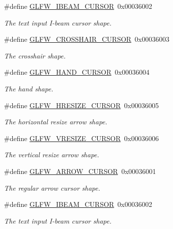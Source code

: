\begin{DoxyCompactItemize}
\#define \hyperlink{group__shapes_ga36185f4375eaada1b04e431244774c86}{G\+L\+F\+W\+\_\+\+I\+B\+E\+A\+M\+\_\+\+C\+U\+R\+S\+OR}~0x00036002
\begin{DoxyCompactList}\small\item\em The text input I-\/beam cursor shape. \end{DoxyCompactList}\item 
\#define \hyperlink{group__shapes_ga8af88c0ea05ab9e8f9ac1530e8873c22}{G\+L\+F\+W\+\_\+\+C\+R\+O\+S\+S\+H\+A\+I\+R\+\_\+\+C\+U\+R\+S\+OR}~0x00036003
\begin{DoxyCompactList}\small\item\em The crosshair shape. \end{DoxyCompactList}\item 
\#define \hyperlink{group__shapes_ga1db35e20849e0837c82e3dc1fd797263}{G\+L\+F\+W\+\_\+\+H\+A\+N\+D\+\_\+\+C\+U\+R\+S\+OR}~0x00036004
\begin{DoxyCompactList}\small\item\em The hand shape. \end{DoxyCompactList}\item 
\#define \hyperlink{group__shapes_gabb3eb0109f11bb808fc34659177ca962}{G\+L\+F\+W\+\_\+\+H\+R\+E\+S\+I\+Z\+E\+\_\+\+C\+U\+R\+S\+OR}~0x00036005
\begin{DoxyCompactList}\small\item\em The horizontal resize arrow shape. \end{DoxyCompactList}\item 
\#define \hyperlink{group__shapes_gaf024f0e1ff8366fb2b5c260509a1fce5}{G\+L\+F\+W\+\_\+\+V\+R\+E\+S\+I\+Z\+E\+\_\+\+C\+U\+R\+S\+OR}~0x00036006
\begin{DoxyCompactList}\small\item\em The vertical resize arrow shape. \end{DoxyCompactList}\item 
\#define \hyperlink{group__shapes_ga8ab0e717245b85506cb0eaefdea39d0a}{G\+L\+F\+W\+\_\+\+A\+R\+R\+O\+W\+\_\+\+C\+U\+R\+S\+OR}~0x00036001
\begin{DoxyCompactList}\small\item\em The regular arrow cursor shape. \end{DoxyCompactList}\item 
\#define \hyperlink{group__shapes_ga36185f4375eaada1b04e431244774c86}{G\+L\+F\+W\+\_\+\+I\+B\+E\+A\+M\+\_\+\+C\+U\+R\+S\+OR}~0x00036002
\begin{DoxyCompactList}\small\item\em The text input I-\/beam cursor shape. \end{DoxyCompactList}\item 

\end{DoxyCompactItemize}
